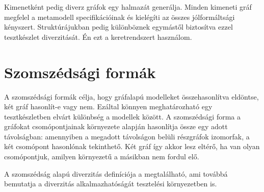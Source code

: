  Kimenetként pedig diverz gráfok egy halmazát generálja. Minden kimeneti gráf megfelel a metamodell specifikációinak és kielégíti az összes jólformáltsági kényszert. Struktúrájukban pedig különböznek egymástől biztosítva ezzel tesztkészlet diverzitását. Én ezt a keretrendszert használom.
 
\section{Szomszédsági formák}

A szomszédsági formák célja, hogy gráfalapú modelleket összehasonlítva eldöntse, két gráf hasonlít-e vagy nem. Ezáltal könnyen meghatározható egy tesztkészletben elvárt különbség a modellek között.
A szomszédsági forma a gráfokat csomópontjainak környezete alapján hasonlítja össze egy adott távolságban: amennyiben a megadott távolságon belüli részgráfok izomorfak, a két csomópont hasonlónak tekinthető. Két gráf így akkor lesz eltérő, ha van olyan csomópontjuk, amilyen környezetű a másikban nem fordul elő.

A szomszédság alapú diverzitás definíciója a \cite{semerath2018iterative} megtalálható, ami továbbá bemutatja a diverzitás alkalmazhatóságát tesztelési környezetben is.






